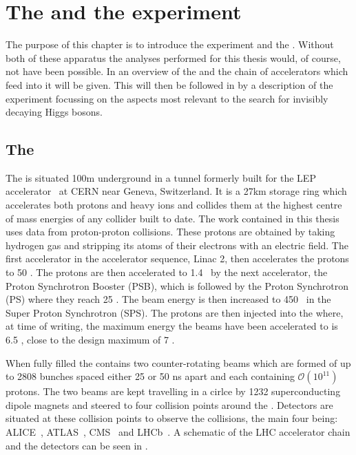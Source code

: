 \chapter{The \LHC and the \CMS experiment}
\label{chap:detector}

The purpose of this chapter is to introduce the \CMS experiment and the \LHC \cite{1748-0221-3-08-S08001}. Without both of these apparatus the analyses performed for this thesis would, of course, not have been possible. In  an overview of the \LHC and the chain of accelerators which feed into it will be given. This will then be followed in  by a description of the \CMS experiment focussing on the aspects most relevant to the search for invisibly decaying Higgs bosons.

\section{The \LHC}
\label{sec:lhc}
The \LHC is situated 100m underground in a tunnel formerly built for the LEP accelerator~\cite{lepdesign} at CERN near Geneva, Switzerland. It is a 27km storage ring which accelerates both protons and heavy ions and collides them at the highest centre of mass energies of any collider built to date. The work contained in this thesis uses data from proton-proton collisions. These protons are obtained by taking hydrogen gas and stripping its atoms of their electrons with an electric field. The first accelerator in the \LHC accelerator sequence, Linac 2, then accelerates the protons to 50 \MeV. The protons are then accelerated to 1.4 \GeV~by the next accelerator, the Proton Synchrotron Booster (PSB), which is followed by the Proton Synchrotron (PS) where they reach 25 \GeV. The beam energy is then increased to 450 \GeV~in the Super Proton Synchrotron (SPS). The protons are then injected into the \LHC where, at time of writing, the maximum energy the beams have been accelerated to is 6.5 \TeV, close to the design maximum of 7 \TeV.

When fully filled the \LHC contains two counter-rotating beams which are formed of up to 2808 bunches spaced either 25 or 50 ns apart and each containing $\mathcal{O}(10^{11})$ protons. The two beams are kept travelling in a cirlce by 1232 superconducting dipole magnets and steered to four collision points around the \LHC. Detectors are situated at these collision points to observe the collisions, the main four being: ALICE~\cite{Aamodt:2008zz}, ATLAS~\cite{Aad:1129811}, CMS~\cite{Chatrchyan:2008aa} and LHCb~\cite{Alves:2008zz}. A schematic of the LHC accelerator chain and the detectors can be seen in .

